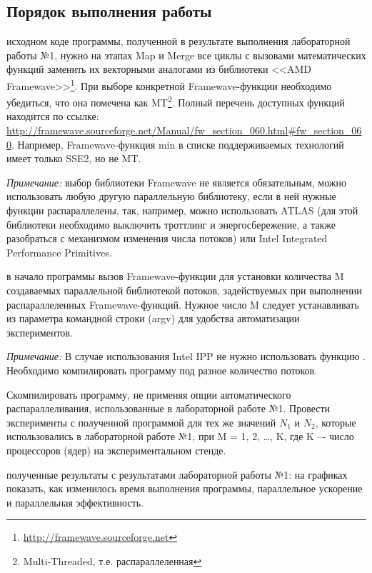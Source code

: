 \subsection{Порядок выполнения работы}
\begin{enumerate}
     исходном коде программы, полученной в результате выполнения лабораторной работы №1, нужно на этапах Map и Merge все циклы с вызовами математических функций заменить их векторными аналогами из библиотеки <<AMD Framewave>>\footnote{\url{http://framewave.sourceforge.net}}. При выборе конкретной Framewave-функции необходимо убедиться, что она помечена как MT\footnote{Multi-Threaded, т.е. распараллеленная}. Полный перечень доступных функций находится по ссылке: \url{http://framewave.sourceforge.net/Manual/fw_section_060.html#fw_section_060}. \quad Например, Framewave-функция min в списке поддерживаемых технологий имеет только SSE2, но не MT\@. 
	
    \textit{Примечание:} выбор библиотеки Framewave не является обязательным, можно использовать любую другую параллельную библиотеку, если в ней нужные функции распараллелены, так, например, можно использовать ATLAS (для этой библиотеки необходимо выключить троттлинг и энергосбережение, а также разобраться с механизмом изменения числа потоков) или Intel Integrated Performance Primitives.
	
     в начало программы вызов Framewave-функции  для установки количества M создаваемых параллельной библиотекой потоков, задействуемых при выполнении распараллеленных Framewave-функций. Нужное число M следует устанавливать из параметра командной строки (argv) для удобства автоматизации экспериментов.
	
    \textit{Примечание:} В случае использования Intel IPP не нужно использовать функцию . Необходимо компилировать программу под разное количество потоков.
	
    Скомпилировать программу, не применяя опции автоматического распараллеливания, использованные в лабораторной работе №1. Провести эксперименты с полученной программой для тех же значений $N_1$ и $N_2$, которые использовались в лабораторной работе №1, при M = 1, 2, \ldots , K, где K –- число процессоров (ядер) на экспериментальном стенде.
		
     полученные результаты с результатами лабораторной работы №1: на графиках показать, как изменилось время выполнения программы, параллельное ускорение и параллельная эффективность.
		

\end{enumerate}
